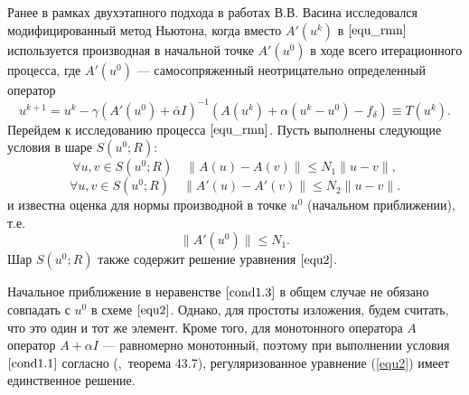 Ранее в рамках двухэтапного подхода в работах В.В. Васина \cite{VasAkiMin2013, Vasin2014} исследовался модифицированный метод Ньютона, когда вместо $A'(u^k)$ в $\eqref{equ_rmn}$ используется производная в начальной точке $A'(u^0)$ в ходе всего итерационного процесса, где $A'(u^0)$ --- самосопряженный неотрицательно определенный оператор  
$$
u^{k+1}=u^k-\gamma(A'(u^0)+\bar\alpha I)^{-1}(A(u^k)+\alpha(u^k-u^0)-f_\delta)\equiv{T(u^k)}.
$$
Перейдем к исследованию процесса $\eqref{equ_rmn}$. Пусть выполнены следующие условия в шаре $S(u^0; R)$:
\begin{equation}\label{cond1.1}
\forall u, v \in S(u^0; R) \quad \|A(u)-A(v)\|\le N_1\|u-v\|,
\end{equation}
\begin{equation}\label{cond1.2}
\forall u, v \in S(u^0; R) \quad \|A'(u)-A'(v)\|\le N_2\|u-v\|.
\end{equation}
и известна оценка для нормы производной в точке $u^0$ (начальном приближении), т.е.
\begin{equation}\label{cond1.3}
\|A'(u^0)\|\le N_1.
\end{equation}
Шар $S(u^0; R)$ также содержит решение уравнения $\eqref{equ2}$. 
\begin{remark}
	Начальное приближение в неравенстве $\eqref{cond1.3}$ в общем случае не обязано совпадать с $u^0$ в схеме $\eqref{equ2}$. Однако, для простоты изложения, будем считать, что это один и тот же элемент. Кроме того, для монотонного оператора $A$ оператор $A+\alpha I$ --- равномерно монотонный, поэтому при выполнении условия $\ref{cond1.1}$ согласно (\cite{KufFuch1988},~теорема 43.7), регуляризованное уравнение (\ref{equ2}) имеет единственное решение.
\end{remark}

